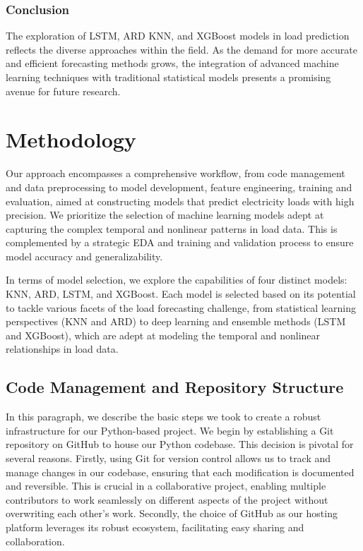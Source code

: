 \documentclass{article} %
\begin{document}
\subsubsection{Conclusion}
The exploration of LSTM, ARD KNN, and XGBoost models in load prediction reflects the diverse approaches within the field. As the demand for more accurate and efficient forecasting methods grows, the integration of advanced machine learning techniques with traditional statistical models presents a promising avenue for future research.



\section{Methodology}
Our approach encompasses a comprehensive workflow, from code management and data preprocessing to model development, feature engineering, training and evaluation, aimed at constructing models that predict electricity loads with high precision. We prioritize the selection of machine learning models adept at capturing the complex temporal and nonlinear patterns in load data. This is complemented by a strategic \gls{EDA} and training and validation process to ensure model accuracy and generalizability.

In terms of model selection, we explore the capabilities of four distinct models: KNN, ARD, LSTM, and XGBoost. Each model is selected based on its potential to tackle various facets of the load forecasting challenge, from statistical learning perspectives (KNN and ARD) to deep learning and ensemble methods (LSTM and XGBoost), which are adept at modeling the temporal and nonlinear relationships in load data. 

\subsection{Code Management and Repository Structure}
In this paragraph, we describe the basic steps we took to create a robust infrastructure for our Python-based project. We begin by establishing a Git repository on GitHub to house our Python codebase. This decision is pivotal for several reasons. Firstly, using Git for version control allows us to track and manage changes in our codebase, ensuring that each modification is documented and reversible. This is crucial in a collaborative project, enabling multiple contributors to work seamlessly on different aspects of the project without overwriting each other's work. Secondly, the choice of GitHub as our hosting platform leverages its robust ecosystem, facilitating easy sharing and collaboration. 
\end{document}
